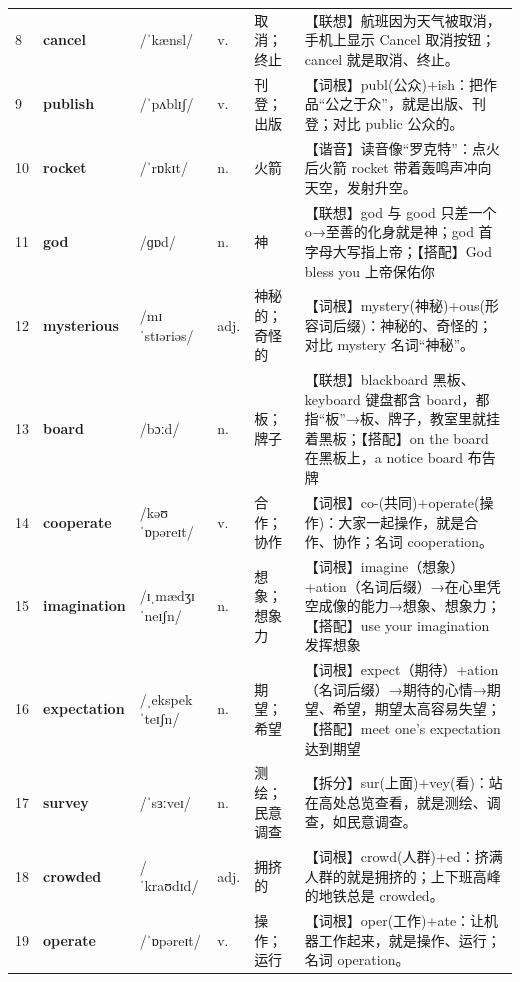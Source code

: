\documentclass[UTF8,a4paper,11pt,oneside]{ctexbook}
\newcommand{\cellword}[1]{{\bfseries\textcolor{wordcol}{#1}}}
\newcommand{\cellipa}[1]{{\footnotesize\textcolor{ipacol}{#1}}}
\newcommand{\cellpos}[1]{\textcolor{poscol}{#1}}
\newcommand{\cellno}[1]{\textcolor{volcolor!75!black}{#1}}
\begin{document}
{\begin{longtable}{@{}C{0.045\textwidth}L{0.155\textwidth}L{0.175\textwidth}C{0.070\textwidth}L{0.180\textwidth}L{0.282\textwidth}@{}}
\cellno{8} & \cellword{cancel} & \cellipa{/ˈkænsl/} & \cellpos{v.} & 取消；终止 & \textcolor{tagAssoc}{【联想】}航班因为天气被取消，手机上显示 Cancel 取消按钮；cancel 就是取消、终止。 \\
 \cellno{9} & \cellword{publish} & \cellipa{/ˈpʌblɪʃ/} & \cellpos{v.} & 刊登；出版 & \textcolor{tagRoot}{【词根】}publ(公众)+ish：把作品“公之于众”，就是出版、刊登；对比 public 公众的。 \\
\cellno{10} & \cellword{rocket} & \cellipa{/ˈrɒkɪt/} & \cellpos{n.} & 火箭 & \textcolor{tagSound}{【谐音】}读音像“罗克特”：点火后火箭 rocket 带着轰鸣声冲向天空，发射升空。 \\
 \cellno{11} & \cellword{god} & \cellipa{/ɡɒd/} & \cellpos{n.} & 神 & \textcolor{tagAssoc}{【联想】}god 与 good 只差一个 o→\allowbreak{}至善的化身就是神；god 首字母大写指上帝；\textcolor{tagColloc}{【搭配】}God bless you 上帝保佑你 \\
\cellno{12} & \cellword{mysterious} & \cellipa{/mɪˈstɪəriəs/} & \cellpos{adj.} & 神秘的；奇怪的 & \textcolor{tagRoot}{【词根】}mystery(神秘)+ous(形容词后缀)：神秘的、奇怪的；对比 mystery 名词“神秘”。 \\
 \cellno{13} & \cellword{board} & \cellipa{/bɔːd/} & \cellpos{n.} & 板；牌子 & \textcolor{tagAssoc}{【联想】}blackboard 黑板、keyboard 键盘都含 board，都指“板”→\allowbreak{}板、牌子，教室里就挂着黑板；\textcolor{tagColloc}{【搭配】}on the board 在黑板上，a notice board 布告牌 \\
\cellno{14} & \cellword{cooperate} & \cellipa{/kəʊˈɒpəreɪt/} & \cellpos{v.} & 合作；协作 & \textcolor{tagRoot}{【词根】}co-(共同)+operate(操作)：大家一起操作，就是合作、协作；名词 cooperation。 \\
 \cellno{15} & \cellword{imagination} & \cellipa{/ɪˌmædʒɪˈneɪʃn/} & \cellpos{n.} & 想象；想象力 & \textcolor{tagRoot}{【词根】}imagine（想象）+ation（名词后缀）→\allowbreak{}在心里凭空成像的能力→\allowbreak{}想象、想象力；\textcolor{tagColloc}{【搭配】}use your imagination 发挥想象 \\
\cellno{16} & \cellword{expectation} & \cellipa{/ˌekspekˈteɪʃn/} & \cellpos{n.} & 期望；希望 & \textcolor{tagRoot}{【词根】}expect（期待）+ation（名词后缀）→\allowbreak{}期待的心情→\allowbreak{}期望、希望，期望太高容易失望；\textcolor{tagColloc}{【搭配】}meet one's expectation 达到期望 \\
 \cellno{17} & \cellword{survey} & \cellipa{/ˈsɜːveɪ/} & \cellpos{n.} & 测绘；民意调查 & \textcolor{tagSplit}{【拆分】}sur(上面)+vey(看)：站在高处总览查看，就是测绘、调查，如民意调查。 \\
\cellno{18} & \cellword{crowded} & \cellipa{/ˈkraʊdɪd/} & \cellpos{adj.} & 拥挤的 & \textcolor{tagRoot}{【词根】}crowd(人群)+ed：挤满人群的就是拥挤的；上下班高峰的地铁总是 crowded。 \\
 \cellno{19} & \cellword{operate} & \cellipa{/ˈɒpəreɪt/} & \cellpos{v.} & 操作；运行 & \textcolor{tagRoot}{【词根】}oper(工作)+ate：让机器工作起来，就是操作、运行；名词 operation。 \\
\end{longtable}
}
\end{document}
